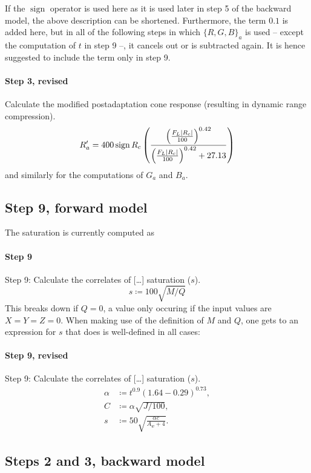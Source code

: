 \documentclass[twocolumn]{scrartcl}
\DeclarePairedDelimiter\abs{\lvert}{\rvert}%
\DeclareMathOperator{\sign}{sign}
\begin{document}
If the $\sign$ operator is used here as it is used later in step 5 of the
backward model, the above description can be shortened.
Furthermore, the term $0.1$ is added here, but in all of the following steps in
which $\{R,G,B\}_a$ is used -- except the computation of $t$ in step 9 --, it
cancels out or is subtracted again. It is hence suggested to include the term
only in step 9.

\paragraph{Step 3, revised}{%
Calculate the modified postadaptation cone response
(resulting in dynamic range compression).
\[
  R'_a = 400 \sign{R_c} \left(\frac{\left(\frac{F_L \abs{R_c}}{100}\right)^{0.42}}{\left(\frac{F_L \abs{R_c}}{100}\right)^{0.42} + 27.13}\right)
\]
and similarly for the computations of $G_a$ and $B_a$.
}

\subsection{Step 9, forward model}

The saturation is currently computed as
\paragraph{Step 9}{%
  Step 9: Calculate the correlates of [\dots] saturation ($s$).
  \[
    s \coloneqq 100 \sqrt{M/Q}
  \]
}
This breaks down if $Q=0$, a value only occuring if the input values are
$X=Y=Z=0$. When making use of the definition of $M$ and $Q$, one gets to an
expression for $s$ that does is well-defined in all cases:
\paragraph{Step 9, revised}{%
  Step 9: Calculate the correlates of [\dots] saturation ($s$).
  \begin{align*}
    \alpha &\coloneqq t^{0.9} {(1.64-0.29)}^{0.73},\\
    C &\coloneqq \alpha \sqrt{J/100},\\
    s &\coloneqq 50 \sqrt{\frac{\alpha c}{A_w + 4}}.
  \end{align*}
}


\subsection{Steps 2 and 3, backward model}
\end{document}
